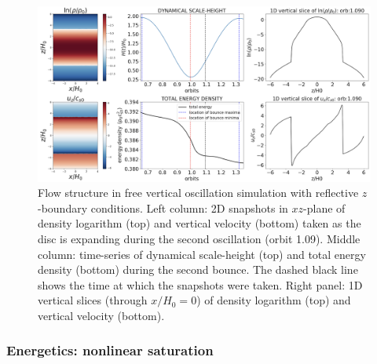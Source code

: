 \documentclass[fleqn,usenatbib]{mnras}
\begin{document}
\begin{figure}
\includegraphics[scale=0.33]{Figures/figure52c_testrun_VSTRHYDRORes32Re4687H6BounceHigherCadenceOrb0toOrb4_logrhovx3_xzplane_dynamicalHTotEnergy_dbl137.png}
\caption{Flow structure in free vertical oscillation simulation with reflective $z$-boundary conditions. Left column: 2D snapshots in $xz$-plane of density logarithm (top) and vertical velocity (bottom) taken as the disc is expanding during the second oscillation (orbit 1.09). Middle column: time-series of dynamical scale-height (top) and total energy density (bottom) during the second bounce. The dashed black line shows the time at which the snapshots were taken. Right panel: 1D vertical slices (through $x/H_0=0$) of density logarithm (top) and vertical velocity (bottom).}
\label{FIGURE_FreeBounceOutflowBCEnergyBudget}
\end{figure}


\subsubsection{Energetics: nonlinear saturation}
\label{SECTION_EnergeticsStronglyBouncingCase}
\end{document}
